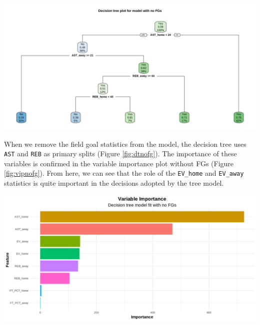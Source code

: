 \documentclass[
  12pt,
  a4paper,
]{article}
\let\origfigure\figure
\let\endorigfigure\endfigure
\renewenvironment{figure}[1][2] {
    \expandafter\origfigure\expandafter[H]
} {
    \endorigfigure
}
\begin{document}
\begin{figure}

{\centering \includegraphics[width=1\linewidth]{latex/plotspng/plot_9} 

}

\caption{Decision tree plot for model without shooting variables}\label{fig:dtnofg}
\end{figure}

When we remove the field goal statistics from the model, the decision tree uses \texttt{AST} and \texttt{REB} as primary splits (Figure \ref{fig:dtnofg}). The importance of these variables is confirmed in the variable importance plot without FGs (Figure \ref{fig:vipnofg}). From here, we can see that the role of the \texttt{EV\_home} and \texttt{EV\_away} statistics is quite important in the decisions adopted by the tree model.

\begin{figure}

{\centering \includegraphics[width=1\linewidth]{latex/plotspng/plot_10} 

}

\caption{Variable Importance plot for model without shooting variables}\label{fig:vipnofg}
\end{figure}
\end{document}
